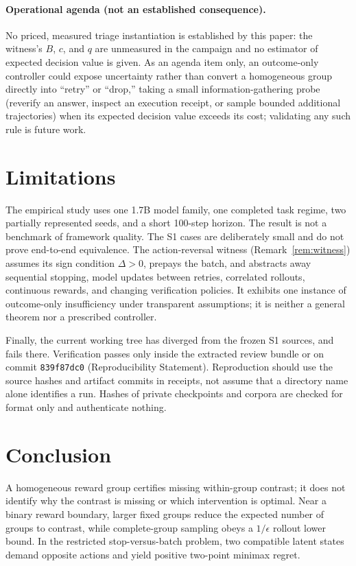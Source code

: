 \documentclass{article}
\begin{document}
\paragraph{Operational agenda (not an established consequence).}
No priced, measured triage instantiation is established by this paper: the
witness's $B$, $c$, and $q$ are unmeasured in the campaign and no estimator
of expected decision value is given.  As an agenda item only, an
outcome-only controller could expose uncertainty rather than convert a
homogeneous group directly into ``retry'' or ``drop,'' taking a small
information-gathering probe (reverify an answer, inspect an execution
receipt, or sample bounded additional trajectories) when its expected
decision value exceeds its cost; validating any such rule is future work.

\section{Limitations}

The empirical study uses one 1.7B model family, one completed task regime, two
partially represented seeds, and a short 100-step horizon.  The result is not a
benchmark of framework quality.  The S1 cases are deliberately small and do not
prove end-to-end equivalence.  The action-reversal witness
(Remark~\ref{rem:witness}) assumes its sign condition $\Delta>0$, prepays the
batch, and abstracts away sequential stopping, model updates between retries,
correlated rollouts, continuous rewards, and changing verification policies.
It exhibits one instance of outcome-only insufficiency under transparent
assumptions; it is neither a general theorem nor a prescribed controller.

Finally, the current working tree has diverged from the frozen S1 sources,
and  fails there.  Verification passes only inside the
extracted review bundle or on commit \texttt{839f87dc0}
(Reproducibility Statement).  Reproduction should use the source hashes and
artifact commits in receipts, not assume that a directory name alone
identifies a run.  Hashes of private checkpoints and corpora are checked for
format only and authenticate nothing.

\section{Conclusion}

A homogeneous reward group certifies missing within-group contrast; it does not
identify why the contrast is missing or which intervention is optimal.  Near a
binary reward boundary, larger fixed groups reduce the expected number of
groups to contrast, while complete-group sampling obeys a $1/\epsilon$ rollout
lower bound.  In the restricted stop-versus-batch problem, two compatible
latent states demand opposite actions and yield positive two-point minimax
regret.
\end{document}

